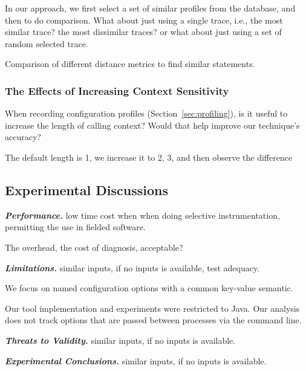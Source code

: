 In our approach, we first select a set of similar profiles from the  database,
and then to do comparison. What about just using a single trace, i.e., the
most similar trace? the most dissimilar traces? or what about just using a set
of random selected trace.

Comparison of different distance metrics to find similar statements.

\subsubsection{The Effects of Increasing Context Sensitivity}

When recording configuration profiles (Section~\ref{sec:profiling}), is it useful
to increase the length of calling context? Would that help improve our technique's accuracy?

The default length is 1, we increase it to 2, 3, and then observe the difference

\subsection{Experimental Discussions}

\noindent \textbf{\textit{Performance.}} low time cost when when doing
selective instrumentation, permitting the use in fielded software.

The overhead, the cost of diagnosis, acceptable?

\vspace{1mm}

\noindent \textbf{\textit{Limitations.}} similar inputs, if no inputs is available, test adequacy.

We focus on named configuration options with a common key-value semantic.

Our tool implementation and experiments were restricted to Java. Our analysis
does not track options that are passed between processes via the command line.

\vspace{1mm}

\noindent \textbf{\textit{Threats to Validity.}} similar inputs, if no inputs is available.

\vspace{1mm}

\noindent \textbf{\textit{Experimental Conclusions.}} similar inputs, if no inputs is available.

